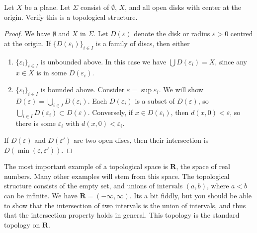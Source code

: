 \begin{exercise}
    Let $X$ be a plane. Let $\Sigma$ consist of $\emptyset$, $X$, and all open disks with center at the origin. Verify this is a topological structure.
\end{exercise}
\begin{proof}
    We have $\emptyset$ and $X$ in $\Sigma$. Let $D(\varepsilon)$ denote the disk or radius $\varepsilon > 0$ centred at the origin. If $\{D(\varepsilon_i)\}_{i \in I}$ is a family of discs, then either
    \begin{enumerate}
        \item $\{\varepsilon_i\}_{i \in I}$ is unbounded above. In this case we have $\bigcup D(\varepsilon_i) = X$, since any $x \in X$ is in some $D(\varepsilon_i)$.
        \item $\{\varepsilon_i\}_{i \in I}$ is bounded above. Consider $\varepsilon = \sup \varepsilon_i$. We will show $D(\varepsilon) = \bigcup_{i \in I} D(\varepsilon_i)$. Each $D(\varepsilon_i)$ is a subset of $D(\varepsilon)$, so $\bigcup_{i \in I} D(\varepsilon_i) \subset D(\varepsilon)$. Conversely, if $x \in D(\varepsilon_i)$, then $d(x,0) < \varepsilon$, so there is some $\varepsilon_i$ with $d(x,0) < \varepsilon_i$.
    \end{enumerate}
    If $D(\varepsilon)$ and $D(\varepsilon')$ are two open discs, then their intersection is $D(\min(\varepsilon, \varepsilon'))$.
\end{proof}

The most important example of a topological space is $\mathbf{R}$, the space of real numbers. Many other examples will stem from this space. The topological structure consists of the empty set, and unions of intervals $(a,b)$, where $a < b$ can be infinite. We have $\mathbf{R} = (-\infty, \infty)$. Its a bit fiddly, but you should be able to show that the intersection of two intervals is the union of intervals, and thus that the intersection property holds in general. This topology is the standard topology on $\mathbf{R}$.

